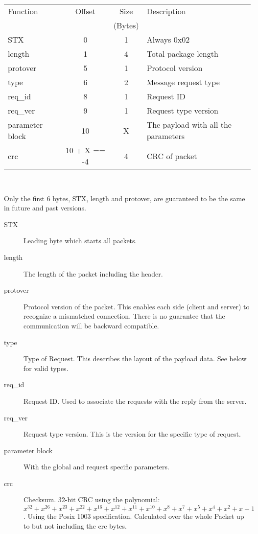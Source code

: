 \documentclass[a4paper]{article}
\begin{document}
\begin{centering}
\begin{tabular}{|l|c|c|l|} \hline
Function        & Offset       & Size    & Description \hfill    \\
                &              & (Bytes) &                       \\\hline
STX             & 0            & 1       & Always 0x02           \\\hline
length          & 1            & 4       & Total package length  \\\hline
protover        & 5            & 1       & Protocol version      \\\hline
type            & 6            & 2       & Message request type  \\\hline
req\_id         & 8            & 1       & Request ID            \\\hline
req\_ver        & 9            & 1       & Request type version  \\\hline
parameter block & 10           & X       & The payload with all
                                           the parameters        \\\hline
crc             & 10 + X == -4 & 4       & CRC of packet         \\\hline
\end{tabular}
\end{centering}
~

Only the first 6 bytes, STX, length and protover, are guaranteed to be the
same in future and past versions.
\begin{description}
   \item[STX] Leading byte which starts all packets.
   \item[length] The length of the packet including the header.
   \item[protover] Protocol version of the packet. This enables
     each side (client and server) to recognize a mismatched connection.
     There is no guarantee that the communication will be backward
     compatible.
   \item[type] Type of Request. This describes the layout of the
     payload data. See below for valid types.
   \item[req\_id] Request ID. Used to associate the requests with
     the reply from the server.
   \item[req\_ver] Request type version. This is the version for the
     specific type of request. 
   \item[parameter block] With the global and request specific parameters.
   \item[crc] Checksum.
     32-bit CRC using the polynomial:
     $x^{32}+x^{26}+x^{23}+x^{22}+x^{16}+x^{12}+x^{11}+x^{10}+x^8+x^7+x^5+
     x^4+x^2+x+1$.
     Using the Posix 1003 specification.
     Calculated over the whole Packet up to but not including the crc bytes.
\end{description}
\end{document}
